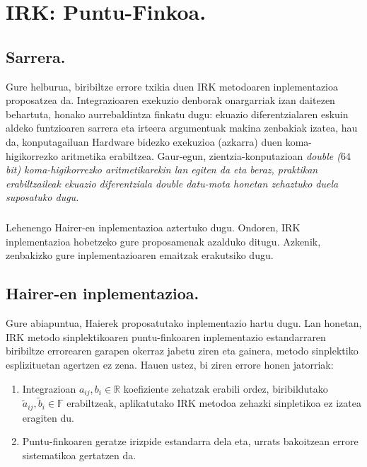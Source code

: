 \chapter{IRK: Puntu-Finkoa.}

\section{Sarrera.}

Gure helburua, biribiltze errore txikia duen IRK metodoaren inplementazioa proposatzea da. Integrazioaren exekuzio denborak onargarriak izan daitezen behartuta, honako aurrebaldintza finkatu dugu: ekuazio diferentzialaren eskuin aldeko funtzioaren 
sarrera eta irteera argumentuak makina zenbakiak izatea, hau da, konputagailuan Hardware bidezko exekuzioa (azkarra) duen koma-higikorrezko aritmetika erabiltzea. Gaur-egun, zientzia-konputazioan \it{double} ($64$ bit) koma-higikorrezko aritmetikarekin lan egiten da eta beraz, praktikan erabiltzaileak ekuazio diferentziala \it{double} datu-mota honetan zehaztuko duela suposatuko dugu.      

\paragraph*{} Lehenengo Hairer-en inplementazioa aztertuko dugu. Ondoren, IRK inplementazioa hobetzeko gure proposamenak azalduko ditugu. Azkenik, zenbakizko gure inplementazioaren emaitzak erakutsiko dugu.

\section{Hairer-en inplementazioa.}

Gure abiapuntua, Haierek \cite{Hairer2008} proposatutako inplementazio hartu dugu.  
Lan honetan, IRK metodo sinplektikoaren puntu-finkoaren inplementazio estandarraren biribiltze errorearen garapen okerraz jabetu ziren eta gainera, metodo sinplektiko esplizituetan agertzen ez zena. Hauen ustez, bi ziren errore honen jatorriak:

\begin{enumerate}
\item Integrazioan $a_{ij}, b_i \in \mathbb{R}$ koefiziente zehatzak erabili ordez, biribildutako $\tilde a_{ij},\tilde b_i \in \mathbb{F}$ erabiltzeak, aplikatutako IRK metodoa zehazki sinpletikoa ez izatea eragiten du.
\item Puntu-finkoaren geratze irizpide estandarra dela eta, urrats bakoitzean errore sistematikoa gertatzen da.
\end{enumerate}    

